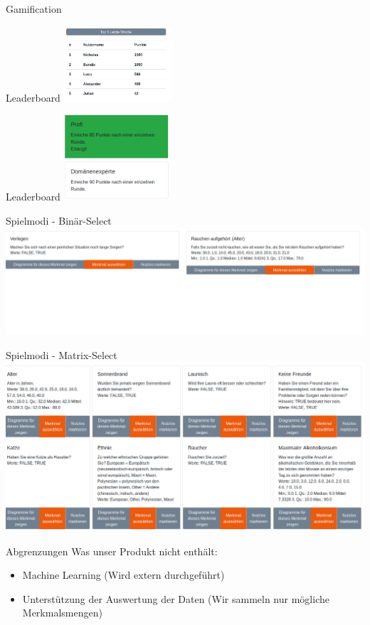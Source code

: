 \documentclass[xcolor=dvipsnames]{beamer}
\begin{document}
    \begin{frame}{Gamification}
        \begin{block}{Leaderboard}
        \center
        \includegraphics[width=0.3\textwidth]{img/leaderboard.png}
        \end{block}
        \begin{block}{Leaderboard}
        \center
        \includegraphics[width=0.3\textwidth]{img/achievment.png}
        \end{block}
    \end{frame}
   \begin{frame}{Spielmodi - Binär-Select}
        \includegraphics[width=\textwidth]{img/binary_select.png}
    \end{frame}
    \begin{frame}{Spielmodi - Matrix-Select}
        \includegraphics[width=\textwidth]{img/matrix_select.png}
    \end{frame}
    \begin{frame}{Abgrenzungen}
        Was unser Produkt nicht enthält:
        \begin{itemize}
            \item Machine Learning (Wird extern durchgeführt)
            \item Unterstützung der Auswertung der Daten (Wir sammeln nur mögliche Merkmalsmengen)
        \end{itemize}
    \end{frame}
 
\end{document}
